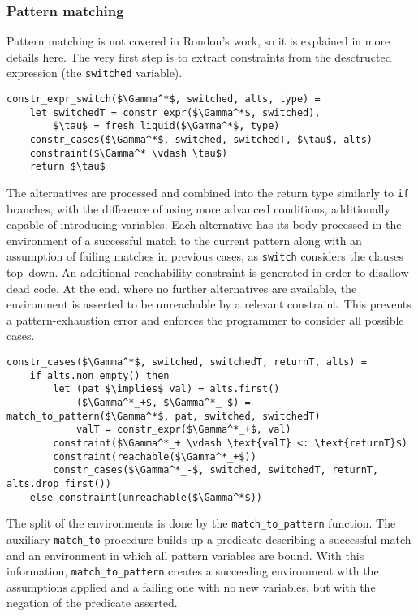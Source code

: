 \subsubsection{Pattern matching}

Pattern matching is not covered in Rondon's work, so it is explained in more
details here. The very first step is to extract constraints from the desctructed
expression (the \texttt{switched} variable).

\begin{lstlisting}[language=pseudocode]
constr_expr_switch($\Gamma^*$, switched, alts, type) =
    let switchedT = constr_expr($\Gamma^*$, switched),
        $\tau$ = fresh_liquid($\Gamma^*$, type)
    constr_cases($\Gamma^*$, switched, switchedT, $\tau$, alts)
    constraint($\Gamma^* \vdash \tau$)
    return $\tau$
\end{lstlisting}

The alternatives are processed and combined into the return type similarly to
\texttt{if} branches, with the difference of using more advanced conditions,
additionally capable of introducing variables. Each alternative has its body
processed in the environment of a successful match to the current pattern along
with an assumption of failing matches in previous cases, as \texttt{switch}
considers the clauses top--down. An additional reachability constraint is
generated in order to disallow dead code. At the end, where no further
alternatives are available, the environment is asserted to be unreachable by a
relevant constraint. This prevents a pattern-exhaustion error and enforces the
programmer to consider all possible cases.

\begin{lstlisting}[language=pseudocode]
constr_cases($\Gamma^*$, switched, switchedT, returnT, alts) =
    if alts.non_empty() then
        let (pat $\implies$ val) = alts.first()
            ($\Gamma^*_+$, $\Gamma^*_-$) = match_to_pattern($\Gamma^*$, pat, switched, switchedT)
            valT = constr_expr($\Gamma^*_+$, val)
        constraint($\Gamma^*_+ \vdash \text{valT} <: \text{returnT}$)
        constraint(reachable($\Gamma^*_+$))
        constr_cases($\Gamma^*_-$, switched, switchedT, returnT, alts.drop_first())
    else constraint(unreachable($\Gamma^*$))
\end{lstlisting}

The split of the environments is done by the \texttt{match\_to\_pattern}
function. The auxiliary \texttt{match\_to} procedure builds up a predicate
describing a successful match and an environment in which all pattern variables
are bound. With this information, \texttt{match\_to\_pattern} creates a
succeeding environment with the assumptions applied and a failing one with no
new variables, but with the negation of the predicate asserted.

